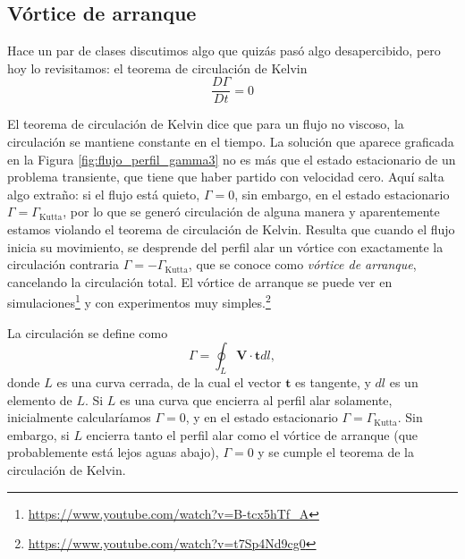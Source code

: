 \subsection*{Vórtice de arranque}
Hace un par de clases discutimos algo que quizás pasó algo desapercibido, pero hoy lo revisitamos: el teorema de circulación de Kelvin
%
\begin{equation}
\frac{D\Gamma}{Dt}=0
\end{equation}

El teorema de circulación de Kelvin dice que para un flujo no viscoso, la circulación se mantiene constante en el tiempo.
La solución que aparece graficada en la Figura \ref{fig:flujo_perfil_gamma3} no es más que el estado estacionario de un problema transiente, que tiene que haber partido con velocidad cero.
Aquí salta algo extraño: si el flujo está quieto, $\Gamma=0$, sin embargo, en el estado estacionario $\Gamma=\Gamma_\text{Kutta}$, por lo que se generó circulación de alguna manera y aparentemente estamos violando el teorema de circulación de Kelvin.
Resulta que cuando el flujo inicia su movimiento, se desprende del perfil alar un vórtice con exactamente la circulación contraria $\Gamma=-\Gamma_\text{Kutta}$, que se conoce como \emph{vórtice de arranque}, cancelando la circulación total.
El vórtice de arranque se puede ver en simulaciones\footnote{\url{https://www.youtube.com/watch?v=B-tcx5hTf_A}} y con experimentos muy simples.\footnote{\url{https://www.youtube.com/watch?v=t7Sp4Nd9cg0}}

La circulación se define como
%
\begin{equation}
\Gamma = \oint_L\mathbf{V}\cdot\mathbf{t}dl,
\end{equation}
%
donde $L$ es una curva cerrada, de la cual el vector $\mathbf{t}$ es tangente, y $dl$ es un elemento de $L$.
Si $L$ es una curva que encierra al perfil alar solamente, inicialmente calcularíamos $\Gamma=0$, y en el estado estacionario $\Gamma=\Gamma_\text{Kutta}$.
Sin embargo, si $L$ encierra tanto el perfil alar como el vórtice de arranque (que probablemente está lejos aguas abajo), $\Gamma=0$ y se cumple el teorema de la circulación de Kelvin.
